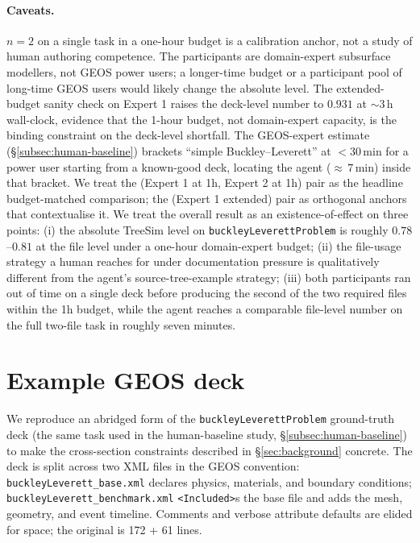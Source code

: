 \documentclass{article}
\begin{document}
\paragraph{Caveats.} $n=2$ on a single task in a one-hour budget is a calibration anchor, not a study of human authoring competence. The participants are domain-expert subsurface modellers, not GEOS power users; a longer-time budget or a participant pool of long-time GEOS users would likely change the absolute level. The extended-budget sanity check on Expert 1 raises the deck-level number to $0.931$ at $\sim\!3\,$h wall-clock, evidence that the 1-hour budget, not domain-expert capacity, is the binding constraint on the deck-level shortfall. The GEOS-expert estimate (\S\ref{subsec:human-baseline}) brackets ``simple Buckley--Leverett'' at ${<}30\,$min for a power user starting from a known-good deck, locating the agent (${\approx}\,7\,$min) inside that bracket. We treat the (Expert 1 at 1h, Expert 2 at 1h) pair as the headline budget-matched comparison; the (Expert 1 extended) pair as orthogonal anchors that contextualise it. We treat the overall result as an existence-of-effect on three points: (i) the absolute TreeSim level on \texttt{buckleyLeverettProblem} is roughly $0.78$--$0.81$ at the file level under a one-hour domain-expert budget; (ii) the file-usage strategy a human reaches for under documentation pressure is qualitatively different from the agent's source-tree-example strategy; (iii) both participants ran out of time on a single deck before producing the second of the two required files within the 1h budget, while the agent reaches a comparable file-level number on the full two-file task in roughly seven minutes.

\section{Example GEOS deck}
\label{app:geos-example}

We reproduce an abridged form of the \texttt{buckleyLeverettProblem} ground-truth deck (the same task used in the human-baseline study, \S\ref{subsec:human-baseline}) to make the cross-section constraints described in \S\ref{sec:background} concrete. The deck is split across two XML files in the GEOS convention: \texttt{buckleyLeverett\_base.xml} declares physics, materials, and boundary conditions; \texttt{buckleyLeverett\_benchmark.xml} \texttt{<Included>}s the base file and adds the mesh, geometry, and event timeline. Comments and verbose attribute defaults are elided for space; the original is 172 + 61 lines.
\end{document}

